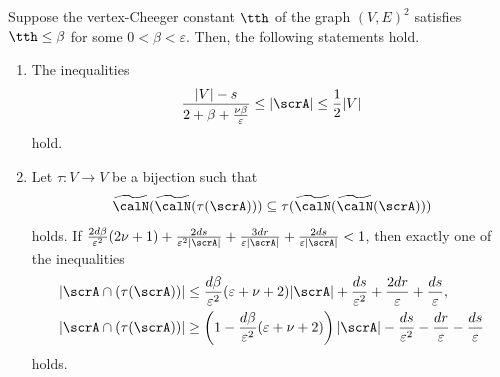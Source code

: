 \begin{proposition}
\label{Prop:AExists}
Suppose the vertex-Cheeger constant $\tth$ of the graph $(V, E)^2$ satisfies $\tth \leq \beta$ for some $0 < \beta < \varepsilon$. Then, the following statements hold. 
\begin{enumerate}
\item 
The inequalities 
$$\frac {|V| -s}{2 + \beta + \frac{\nu\beta}{\varepsilon} } \leq |\scrA| \leq \frac 12 |V|$$ 
hold. 
\item 
Let $\tau: V \to V$ be a bijection such that 
$$
\widetilde\calN (\widetilde\calN(\tau(\scrA)))\subseteq \tau(\widetilde \calN(\widetilde \calN(\scrA))) 
$$
holds. If 
$
\frac {2d\beta} { \varepsilon^2} ( 2\nu + 1) 
+ \frac{2d s}{\varepsilon^2 |\scrA|}
+ \frac{3dr}{\varepsilon |\scrA|}
+ \frac{2ds}{\varepsilon |\scrA|}
<1 
$, then exactly one of the inequalities  
\begin{align*}
|\scrA \cap (\tau(\scrA)) |
& \leq  \frac{d \beta}{\varepsilon^2} (\varepsilon + \nu + 2)|\scrA|+  \frac {ds}{\varepsilon^2} + \frac{2dr}\varepsilon +\frac{ds}{\varepsilon},\\
|\scrA \cap (\tau(\scrA)) |
& \geq \left( 1- \frac {d\beta}{ \varepsilon^2} ( \varepsilon + \nu + 2)\right)|\scrA| - \frac {ds}{\varepsilon^2}
-\frac{dr}{\varepsilon}
-\frac{ds}{\varepsilon} 
\end{align*}
holds.
\end{enumerate}
\end{proposition}

